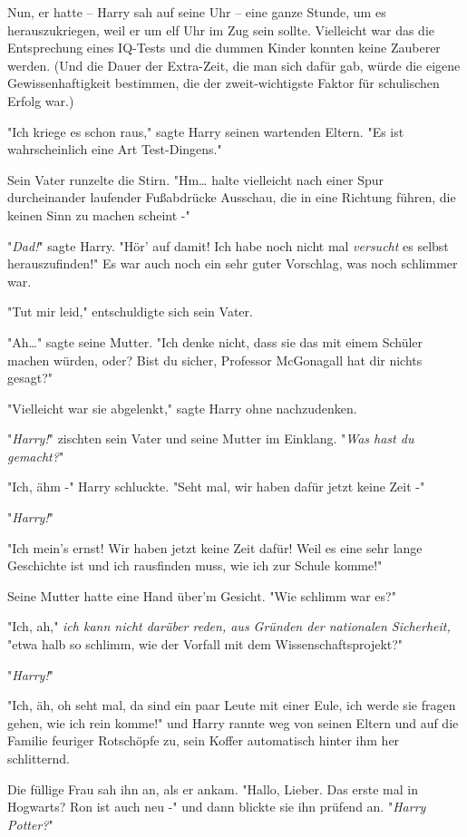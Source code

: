 {Nun, er hatte -- Harry sah auf seine Uhr -- eine ganze Stunde, um es herauszukriegen, weil er um elf Uhr im Zug sein sollte. Vielleicht war das die Entsprechung eines IQ-Tests und die dummen Kinder konnten keine Zauberer werden. (Und die Dauer der Extra-Zeit, die man sich dafür gab, würde die eigene Gewissenhaftigkeit bestimmen, die der zweit-wichtigste Faktor für schulischen Erfolg war.)

"Ich kriege es schon raus," sagte Harry seinen wartenden Eltern. "Es ist wahrscheinlich eine Art Test-Dingens."

Sein Vater runzelte die Stirn. "Hm… halte vielleicht nach einer Spur durcheinander laufender Fußabdrücke Ausschau, die in eine Richtung führen, die keinen Sinn zu machen scheint -"

"\emph{Dad!}" sagte Harry. "Hör' auf damit! Ich habe noch nicht mal \emph{versucht} es selbst herauszufinden!" Es war auch noch ein sehr guter Vorschlag, was noch schlimmer war.

"Tut mir leid," entschuldigte sich sein Vater.

"Ah…" sagte seine Mutter. "Ich denke nicht, dass sie das mit einem Schüler machen würden, oder? Bist du sicher, Professor McGonagall hat dir nichts gesagt?"

"Vielleicht war sie abgelenkt," sagte Harry ohne nachzudenken.

"\emph{Harry!}" zischten sein Vater und seine Mutter im Einklang. "\emph{Was hast du gemacht?}"

"Ich, ähm -" Harry schluckte. "Seht mal, wir haben dafür jetzt keine Zeit -"

"\emph{Harry!}"

"Ich mein's ernst! Wir haben jetzt keine Zeit dafür! Weil es eine sehr lange Geschichte ist und ich rausfinden muss, wie ich zur Schule komme!"

Seine Mutter hatte eine Hand über'm Gesicht. "Wie schlimm war es?"

"Ich, ah," \emph{ich kann nicht darüber reden, aus Gründen der nationalen Sicherheit,} "etwa halb so schlimm, wie der Vorfall mit dem Wissenschaftsprojekt?"

"\emph{Harry!}"

"Ich, äh, oh seht mal, da sind ein paar Leute mit einer Eule, ich werde sie fragen gehen, wie ich rein komme!" und Harry rannte weg von seinen Eltern und auf die Familie feuriger Rotschöpfe zu, sein Koffer automatisch hinter ihm her schlitternd.

Die füllige Frau sah ihn an, als er ankam. "Hallo, Lieber. Das erste mal in Hogwarts? Ron ist auch neu -" und dann blickte sie ihn prüfend an. "\emph{Harry Potter?}"

}
